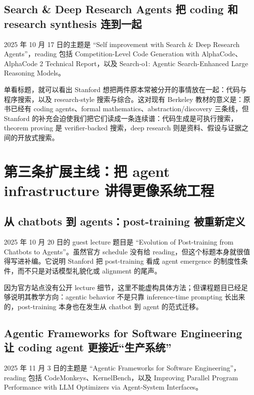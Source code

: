 \documentclass[UTF8]{ctexbook}
\begin{document}
\subsection{Search \& Deep Research Agents 把 coding 和 research synthesis 连到一起}

2025 年 10 月 17 日的主题是 ``Self improvement with Search \& Deep Research Agents''，reading 包括 Competition-Level Code Generation with AlphaCode、AlphaCode 2 Technical Report，以及 Search-o1: Agentic Search-Enhanced Large Reasoning Models。

单看标题，就可以看出 Stanford 想把两件原本常被分开的事情放在一起：代码与程序搜索，以及 research-style 搜索与综合。这对现有 Berkeley 教材的意义是：原书已经有 coding agents、formal mathematics、abstraction/discovery 三条线，但 Stanford 的补充会迫使我们把它们读成一条连续谱：代码生成是可执行搜索，theorem proving 是 verifier-backed 搜索，deep research 则是资料、假设与证据之间的开放式搜索。

\section{第三条扩展主线：把 agent infrastructure 讲得更像系统工程}

\subsection{从 chatbots 到 agents：post-training 被重新定义}

2025 年 10 月 20 日的 guest lecture 题目是 ``Evolution of Post-training from Chatbots to Agents''。虽然官方 schedule 没有给 reading，但这个标题本身就很值得写进补编。它说明 Stanford 把 post-training 看成 agent emergence 的制度性条件，而不只是对话模型礼貌化或 alignment 的尾声。

因为官方站点没有公开 lecture 细节，这里不能虚构具体方法；但课程题目已经足够说明其教学方向：agentic behavior 不是只靠 inference-time prompting 长出来的，post-training 本身也在发生从 chatbot 到 agent 的范式迁移。

\subsection{Agentic Frameworks for Software Engineering 让 coding agent 更接近“生产系统”}

2025 年 11 月 3 日的主题是 ``Agentic Frameworks for Software Engineering''，reading 包括 CodeMonkeys、KernelBench，以及 Improving Parallel Program Performance with LLM Optimizers via Agent-System Interfaces。
\end{document}
